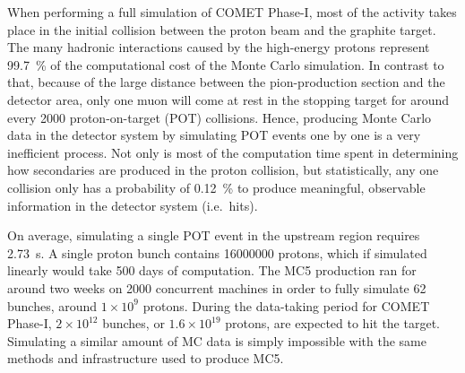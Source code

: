 When performing a full simulation of COMET Phase-I, most of the activity takes place in the initial collision between the proton beam and the graphite target. The many hadronic interactions caused by the high-energy protons represent \SI{99.7}{\percent} of the computational cost of the Monte Carlo simulation.
In contrast to that, because of the large distance between the pion-production section and the detector area, only one muon will come at rest in the stopping target for around every \num{2000} proton-on-target (POT) collisions. Hence, producing Monte Carlo data in the detector system by simulating POT events one by one is a very inefficient process. Not only is most of the computation time spent in determining how secondaries are produced in the proton collision, but statistically, any one collision only has a probability of \SI{0.12}{\percent} to produce meaningful, observable information in the detector system (i.e.\ hits).

On average, simulating a single POT event in the upstream region requires \SI{2.73}{\second}. A single proton bunch contains \num{16000000} protons, which if simulated linearly would take 500 days of computation. The MC5 production ran for around two weeks on 2000 concurrent machines in order to fully simulate 62 bunches, around $1\times10^9$ protons. During the data-taking period for COMET Phase-I, $2\times10^{12}$ bunches, or $1.6\times 10^{19}$ protons, are expected to hit the target. Simulating a similar amount of MC data is simply impossible with the same methods and infrastructure used to produce MC5.


